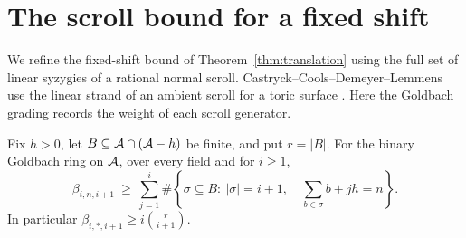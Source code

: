 \section{The scroll bound for a fixed shift}
\label{app:scroll-shift}

We refine the fixed-shift bound of Theorem~\ref{thm:translation} using
the full set of linear syzygies of a rational normal scroll.
Castryck--Cools--Demeyer--Lemmens
use the linear strand of an ambient scroll for a toric surface
\cite[Sec.~4.1]{CCDL19}. Here the Goldbach grading records the weight
of each scroll generator.

\begin{proposition}\label{thm:scroll-shift}
Fix $h>0$, let $B\subseteq\mathcal A\cap(\mathcal A-h)$ be finite, and put $r=|B|$.
For the binary Goldbach ring on $\mathcal A$, over every field and for $i\ge1$,
\[
 \beta_{i,n,i+1}\ \ge\
 \sum_{j=1}^{i}\#\left\{\sigma\subseteq B:\
       |\sigma|=i+1,\quad \sum_{b\in\sigma} b+jh=n\right\}.
\]
In particular $\beta_{i,*,i+1}\ge i\binom{r}{i+1}$.
\end{proposition}
